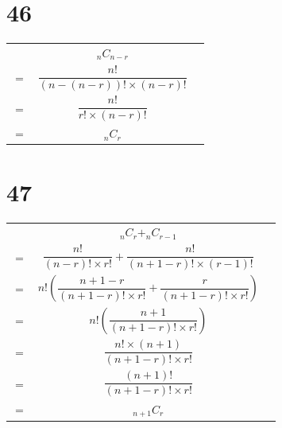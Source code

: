 \documentclass{article}
\theoremstyle{definition}
\newcommand{\?}{\stackrel{?}{=}}
\begin{document}
\section*{46}
\begin{center}
\begin{tabular}{ccc}
    & $_nC_{n-r}$ \\
$=$ & $\dfrac{n!}{\left(n-\left(n-r\right)\right)!\times \left(n-r\right)!}$ \\
$=$ & $\dfrac{n!}{r!\times \left(n-r\right)!}$ \\
$=$ & $_nC_r$
\end{tabular}
\end{center}

\section*{47}
\begin{center}
\begin{tabular}{ccc}
    & $_nC_r+_nC_{r-1}$ \\
$=$ & $\dfrac{n!}{\left(n-r\right)!\times r!}+\dfrac{n!}{\left(n+1-r\right)!\times\left(r-1\right)!}$ \\
$=$ & $n!\left(\dfrac{n+1-r}{\left(n+1-r\right)!\times r!}+\dfrac{r}{\left(n+1-r\right)!\times r!}\right)$ \\
$=$ & $n!\left(\dfrac{n+1}{\left(n+1-r\right)!\times r!}\right)$ \\
$=$ & $\dfrac{n!\times\left(n+1\right)}{\left(n+1-r\right)!\times r!}$ \\
$=$ & $\dfrac{\left(n+1\right)!}{\left(n+1-r\right)!\times r!}$ \\
$=$ & $_{n+1}C_r$
\end{tabular}
\end{center}
\end{document}
